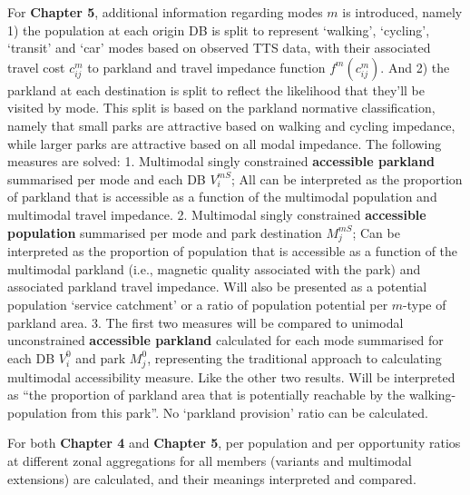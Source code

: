 \documentclass[
11pt, %
oneside, %
english, %
singlespacing, %
]{macthesis} %
\begin{document}
For \textbf{Chapter 5}, additional information regarding modes \(m\) is introduced, namely 1) the population at each origin DB is split to represent `walking', `cycling', `transit' and `car' modes based on observed TTS data, with their associated travel cost \(c_{ij}^m\) to parkland and travel impedance function \(f^m (c^m_{ij})\). And 2) the parkland at each destination is split to reflect the likelihood that they'll be visited by mode. This split is based on the parkland normative classification, namely that small parks are attractive based on walking and cycling impedance, while larger parks are attractive based on all modal impedance. The following measures are solved:
1. Multimodal singly constrained \textbf{accessible parkland} summarised per mode and each DB \(V_i^{mS}\); All can be interpreted as the proportion of parkland that is accessible as a function of the multimodal population and multimodal travel impedance.
2. Multimodal singly constrained \textbf{accessible population} summarised per mode and park destination \(M_j^{mS}\); Can be interpreted as the proportion of population that is accessible as a function of the multimodal parkland (i.e., magnetic quality associated with the park) and associated parkland travel impedance. Will also be presented as a potential population `service catchment' or a ratio of population potential per \(m\)-type of parkland area.
3. The first two measures will be compared to unimodal unconstrained \textbf{accessible parkland} calculated for each mode summarised for each DB \(V_i^{0}\) and park \(M_j^{0}\), representing the traditional approach to calculating multimodal accessibility measure. Like the other two results. Will be interpreted as ``the proportion of parkland area that is potentially reachable by the walking-population from this park''. No `parkland provision' ratio can be calculated.

For both \textbf{Chapter 4} and \textbf{Chapter 5}, per population and per opportunity ratios at different zonal aggregations for all members (variants and multimodal extensions) are calculated, and their meanings interpreted and compared.
\end{document}

